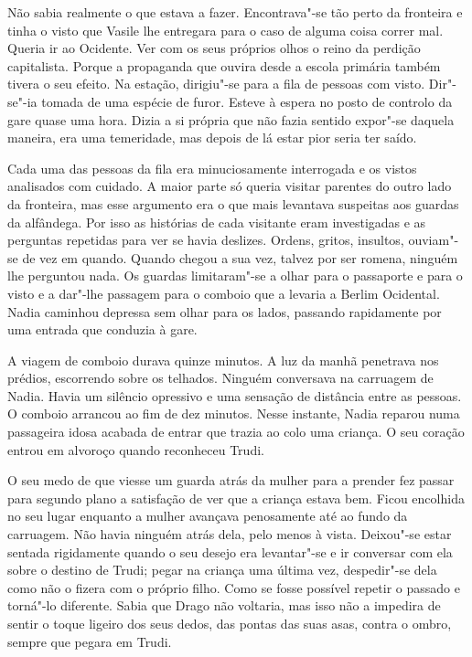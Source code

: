 Não sabia realmente o que estava a fazer. Encontrava"-se tão perto da fronteira e tinha o visto que Vasile lhe entregara para
o caso de alguma coisa correr mal. Queria
ir ao Ocidente. Ver com os seus próprios olhos o reino da perdição
capitalista. Porque a propaganda que ouvira desde a escola primária
também tivera o seu efeito. Na estação, dirigiu"-se para a fila de
pessoas com visto. Dir"-se"-ia tomada de uma espécie de furor. Esteve à espera no posto de controlo
da gare quase uma hora. Dizia a si própria que não fazia sentido
expor"-se daquela maneira, era uma temeridade, mas depois de lá estar
pior seria ter saído.

Cada uma das pessoas da fila era minuciosamente interrogada e os
vistos analisados com cuidado. A maior parte só queria visitar parentes
do outro lado da fronteira, mas esse argumento era o que mais levantava
suspeitas aos guardas da alfândega. Por isso as histórias de cada
visitante eram investigadas e as perguntas repetidas para ver se havia
deslizes. Ordens, gritos, insultos, ouviam"-se de vez em quando. Quando
chegou a sua vez, talvez por ser romena, ninguém lhe perguntou nada. Os
guardas limitaram"-se a olhar para o passaporte e para o visto e a
dar"-lhe passagem para o comboio que a levaria a Berlim Ocidental. Nadia
caminhou depressa sem olhar para os lados, passando rapidamente por uma
entrada que conduzia à gare.

A viagem de comboio durava quinze minutos. A luz da manhã penetrava nos
prédios, escorrendo sobre os telhados. Ninguém conversava na carruagem
de Nadia. Havia um silêncio opressivo e uma sensação de distância entre
as pessoas. O comboio arrancou ao fim de dez minutos. Nesse instante,
Nadia reparou numa passageira idosa acabada de entrar que trazia ao colo
uma criança. O seu coração entrou em alvoroço quando reconheceu Trudi.

O seu medo de que viesse um guarda atrás da mulher para a prender fez
passar para segundo plano a satisfação de ver que a criança estava bem.
Ficou encolhida no seu lugar enquanto a mulher avançava penosamente até
ao fundo da carruagem. Não havia ninguém atrás dela, pelo menos à vista.
Deixou"-se estar sentada rigidamente quando o seu desejo era levantar"-se
e ir conversar com ela sobre o destino de Trudi; pegar na criança uma
última vez, despedir"-se dela como não o fizera com o próprio filho. Como
se fosse possível repetir o passado e torná"-lo diferente. Sabia que
Drago não voltaria, mas isso não a impedira de sentir o toque ligeiro
dos seus dedos, das pontas das suas asas, contra o ombro, sempre que
pegara em Trudi.

